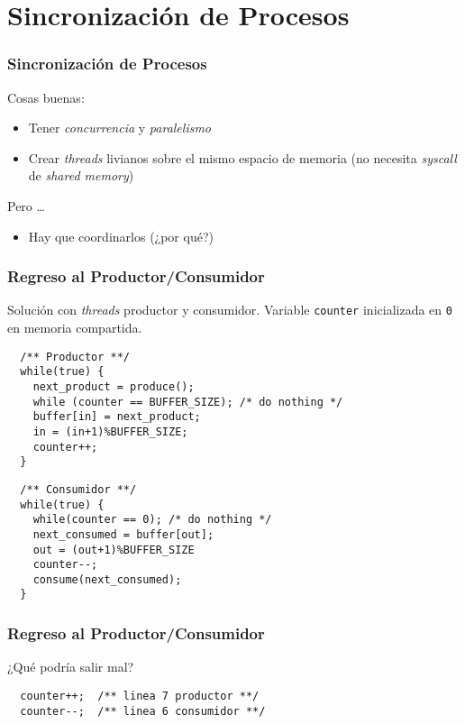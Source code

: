 \documentclass[letter]{beamer}
\begin{document}
\section{Sincronización de Procesos}

\begin{frame}
  \frametitle{Sincronización de Procesos}

  Cosas buenas:
  \begin{itemize}
    \item Tener {\em concurrencia} y {\em paralelismo}
    \item Crear {\em threads} livianos sobre el mismo espacio de memoria (no necesita {\em syscall} de {\em shared memory}) 
  \end{itemize}
  Pero \ldots
  \begin{itemize}
    \item Hay que coordinarlos (¿por qué?)
  \end{itemize}
  
\end{frame}

\begin{frame}[fragile]
  \frametitle{Regreso al Productor/Consumidor}
  Solución con {\em threads} productor y consumidor. 
  Variable {\tt counter} inicializada en {\tt 0} en memoria compartida.
  
\begin{verbatim}
  /** Productor **/
  while(true) {
    next_product = produce();
    while (counter == BUFFER_SIZE); /* do nothing */
    buffer[in] = next_product;
    in = (in+1)%BUFFER_SIZE;
    counter++;
  }
\end{verbatim}

\begin{verbatim}
  /** Consumidor **/  
  while(true) {
    while(counter == 0); /* do nothing */
    next_consumed = buffer[out];
    out = (out+1)%BUFFER_SIZE
    counter--;
    consume(next_consumed);
  }
\end{verbatim}  

\end{frame}

\begin{frame}[fragile]
  \frametitle{Regreso al Productor/Consumidor}

  ¿Qué podría salir mal?
  
\begin{verbatim}
  counter++;  /** linea 7 productor **/
  counter--;  /** linea 6 consumidor **/
\end{verbatim}
  

\end{frame}
\end{document}
